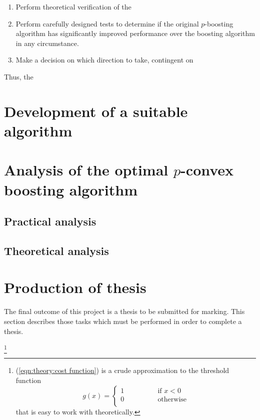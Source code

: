 \begin{enumerate}

\item	Perform theoretical verification of the 


\item	Perform carefully designed tests to determine if the original
	$p$-boosting algorithm has significantly improved performance
	over the boosting algorithm in any circumstance.

\item	Make a decision on which direction to take, contingent on

\end{enumerate}

Thus, the 



\section{Development of a suitable algorithm}

\section{Analysis of the optimal $p$-convex boosting algorithm}

\subsection{Practical analysis}

\subsection{Theoretical analysis}

\section{Production of thesis}

The final outcome of this project is a thesis to be submitted for
marking.  This section describes those tasks which must be performed
in order to complete a thesis.


\footnote{(\ref{eqn:theory:cost
function}) is a crude approximation to the threshold function 
\[ g(x) = \left\{ \begin{array}{ll}
1 \qquad \qquad & \mbox{if $x<0$} \\
0		& \mbox{otherwise} \\
\end{array} \right. \]
that is easy to work with theoretically.}



